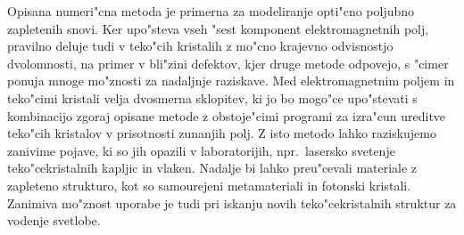 \documentclass[12pt,twoside,openright,final,a4paper]{report}
\begin{document}
Opisana numeri"cna metoda je primerna za modeliranje opti"cno poljubno zapletenih snovi. 
Ker upo"steva vseh "sest komponent elektromagnetnih polj, pravilno deluje tudi v teko"cih kristalih z mo"cno krajevno odvisnostjo dvolomnosti, na primer v bli"zini defektov, kjer druge metode odpovejo, s "cimer ponuja mnoge mo"znosti za nadaljnje raziskave. 
Med elektromagnetnim poljem in teko"cimi kristali velja dvosmerna sklopitev, ki jo bo mogo"ce upo"stevati s kombinacijo zgoraj opisane metode z obstoje"cimi programi za izra"cun ureditve teko"cih kristalov v prisotnosti zunanjih polj. 
Z isto metodo lahko raziskujemo zanivime pojave, ki so jih opazili v laboratorijih, npr.~lasersko svetenje teko"cekristalnih kapljic in vlaken. 
Nadalje bi lahko preu"cevali materiale z zapleteno strukturo, kot so samourejeni metamateriali in fotonski kristali. 
Zanimiva mo"znost uporabe je tudi pri iskanju novih teko"cekristalnih struktur za vodenje svetlobe. 



\end{document}

